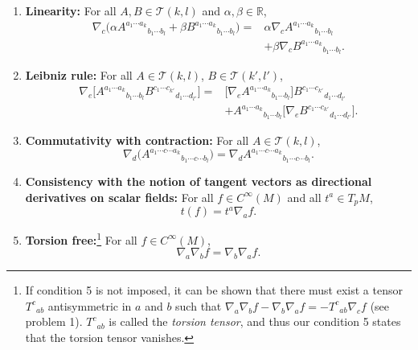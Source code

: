 \begin{enumerate}[label=\arabic*.,leftmargin=*]
\item \textbf{Linearity:} For all $A,B\in\mathcal T(k,l)$ and $\alpha,\beta\in\mathbb R$,
\begin{equation*}
  \begin{aligned}
    \nabla_c\bigl(\alpha A^{a_1\cdots a_k}{}_{b_1\cdots b_l}
    +\beta B^{a_1\cdots a_k}{}_{b_1\cdots b_l}\bigr)
    ={}&\alpha\nabla_c A^{a_1\cdots a_k}{}_{b_1\cdots b_l}\\
    &+\beta\nabla_c B^{a_1\cdots a_k}{}_{b_1\cdots b_l}.
  \end{aligned}
\end{equation*}

\item \textbf{Leibniz rule:} For all $A\in\mathcal T(k,l)$, $B\in\mathcal T(k',l')$,
\begin{equation*}
  \begin{aligned}
    \nabla_e\bigl[A^{a_1\cdots a_k}{}_{b_1\cdots b_l}
    B^{c_1\cdots c_{k'}}{}_{d_1\cdots d_{l'}}\bigr]
    ={}&\bigl[\nabla_eA^{a_1\cdots a_k}{}_{b_1\cdots b_l}\bigr]
    B^{c_1\cdots c_{k'}}{}_{d_1\cdots d_{l'}}\\
    &+A^{a_1\cdots a_k}{}_{b_1\cdots b_l}
    \bigl[\nabla_eB^{c_1\cdots c_{k'}}{}_{d_1\cdots d_{l'}}\bigr].
  \end{aligned}
\end{equation*}

\item \textbf{Commutativity with contraction:} For all $A\in\mathcal T(k,l)$,
\begin{equation*}
  \nabla_d\bigl(A^{a_1\cdots c\cdots a_k}{}_{b_1\cdots c\cdots b_l}\bigr)
  =\nabla_d A^{a_1\cdots c\cdots a_k}{}_{b_1\cdots c\cdots b_l}.
\end{equation*}

\item \textbf{Consistency with the notion of tangent vectors as directional derivatives on scalar
fields:} For all $f\in C^\infty(M)$ and all $t^a\in T_pM$,
\begin{equation*}
  t(f)=t^a\nabla_af.
\end{equation*}

\item \textbf{Torsion free:}\footnote{If condition 5 is not imposed, it can be shown that there
must exist a tensor $T^c{}_{ab}$ antisymmetric in $a$ and $b$ such that
$\nabla_a\nabla_bf-\nabla_b\nabla_af=-T^c{}_{ab}\nabla_cf$ (see problem 1).
$T^c{}_{ab}$ is called the \emph{torsion tensor}, and thus our condition 5 states that the torsion
tensor vanishes.} For all $f\in C^\infty(M)$,
\begin{equation*}
  \nabla_a\nabla_bf=\nabla_b\nabla_af.
\end{equation*}
\end{enumerate}

